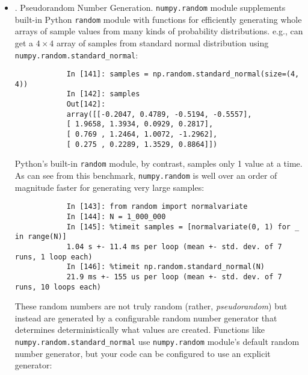 \documentclass{article}
\begin{document}
\begin{itemize}
\begin{itemize}
\begin{itemize}
\begin{verbatim}
				In [17]: np.dot(arr.T, arr)
				Out[17]: 
				array([[39, 20, 12],
				[20, 14,  2],
				[12,  2, 10]])
			\end{verbatim}
			\verb|@infix| operator is another way to do matrix multiplication:
			\begin{verbatim}
				In [138]: arr.T @ arr
				Out[138]:
				array([[39, 20, 12],
				[20, 14, 2],
				[12, 2, 10]])
			\end{verbatim}
			Simple transposing with {\tt.T} is a special case of swapping axes. ndarray has method {\tt swapaxes}, which takes a pair of axis numbers \& switches indicated axes to rearrange data:
			\begin{verbatim}
				In [139]: arr
				Out[139]:
				array([[ 0, 1, 0],
				[ 1, 2, -2],
				[ 6, 3, 2],
				[-1, 0, -1],
				[ 1, 0, 1]])
				In [140]: arr.swapaxes(0, 1)
				Out[140]:
				array([[ 0, 1, 6, -1, 1],
				[ 1, 2, 3, 0, 0],
				[ 0, -2, 2, -1, 1]])
			\end{verbatim}
			{\tt swapaxes} similarly returns a view on data without making a copy.
		\end{itemize}
		\item {. Pseudorandom Number Generation.} {\tt numpy.random} module supplements built-in Python {\tt random} module with functions for efficiently generating whole arrays of sample values from many kinds of probability distributions. e.g., can get a $4\times4$ array of samples from standard normal distribution using \verb|numpy.random.standard_normal|:
		\begin{verbatim}
			In [141]: samples = np.random.standard_normal(size=(4, 4))
			In [142]: samples
			Out[142]:
			array([[-0.2047, 0.4789, -0.5194, -0.5557],
			[ 1.9658, 1.3934, 0.0929, 0.2817],
			[ 0.769 , 1.2464, 1.0072, -1.2962],
			[ 0.275 , 0.2289, 1.3529, 0.8864]])
		\end{verbatim}
		Python's built-in {\tt random} module, by contrast, samples only 1 value at a time. As can see from this benchmark, {\tt numpy.random} is well over an order of magnitude faster for generating very large samples:
		\begin{verbatim}
			In [143]: from random import normalvariate
			In [144]: N = 1_000_000
			In [145]: %timeit samples = [normalvariate(0, 1) for _ in range(N)]
			1.04 s +- 11.4 ms per loop (mean +- std. dev. of 7 runs, 1 loop each)
			In [146]: %timeit np.random.standard_normal(N)
			21.9 ms +- 155 us per loop (mean +- std. dev. of 7 runs, 10 loops each)
		\end{verbatim}
		These random numbers are not truly random (rather, {\it pseudorandom}) but instead are generated by a configurable random number generator that determines deterministically what values are created. Functions like \verb|numpy.random.standard_normal| use {\tt numpy.random} module's default random number generator, but your code can be configured to use an explicit generator:

\end{itemize}
\end{itemize}
\end{document}
